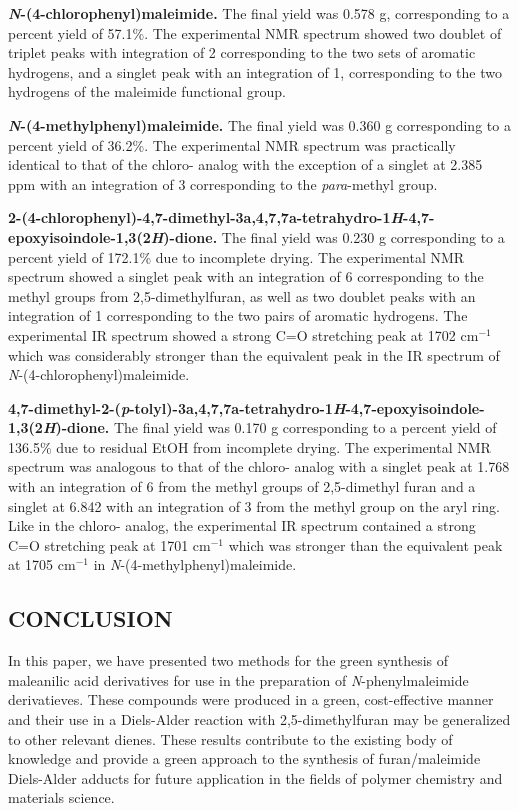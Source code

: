 \documentclass[11pt]{article}
\let\bf\textbf
\begin{document}
\bf{\textit{N}-(4-chlorophenyl)maleimide.} The final yield was 0.578 g, corresponding to a percent yield of 57.1\%. The experimental NMR spectrum showed two doublet of triplet peaks with integration of 2 corresponding to the two sets of aromatic hydrogens, and a singlet peak with an integration of 1, corresponding to the two hydrogens of the maleimide functional group. 

\bf{\textit{N}-(4-methylphenyl)maleimide.} The final yield was 0.360 g corresponding to a percent yield of 36.2\%. The experimental NMR spectrum was practically identical to that of the chloro- analog with the exception of a singlet at 2.385 ppm with an integration of 3 corresponding to the \textit{para}-methyl group.

\bf{2-(4-chlorophenyl)-4,7-dimethyl-3a,4,7,7a-tetrahydro-1\textit{H}-4,7-epoxyisoindole-1,3(2\textit{H})-dione.} The final yield was 0.230 g corresponding to a percent yield of 172.1\% due to incomplete drying. The experimental NMR spectrum showed a singlet peak with an integration of 6 corresponding to the methyl groups from 2,5-dimethylfuran, as well as two doublet peaks with an integration of 1 corresponding to the two pairs of aromatic hydrogens. The experimental IR spectrum showed a strong C=O stretching peak at 1702 cm$^{-1}$ which was considerably stronger than the equivalent peak in the IR spectrum of \textit{N}-(4-chlorophenyl)maleimide. 

\bf{4,7-dimethyl-2-(\textit{p}-tolyl)-3a,4,7,7a-tetrahydro-1\textit{H}-4,7-epoxyisoindole-1,3(2\textit{H})-dione.} The final yield was 0.170 g corresponding to a percent yield of 136.5\% due to residual EtOH from incomplete drying. The experimental NMR spectrum was analogous to that of the chloro- analog with a singlet peak at 1.768 with an integration of 6 from the methyl groups of 2,5-dimethyl furan and a singlet at 6.842 with an integration of 3 from the methyl group on the aryl ring. Like in the chloro- analog, the experimental IR spectrum contained a strong C=O stretching peak at 1701 cm$^{-1}$ which was stronger than the equivalent peak at 1705 cm$^{-1}$ in \textit{N}-(4-methylphenyl)maleimide.

\subsection*{CONCLUSION}
In this paper, we have presented two methods for the green synthesis of maleanilic acid derivatives for use in the preparation of \textit{N}-phenylmaleimide derivatieves. These compounds were produced in a green, cost-effective manner and their use in a Diels-Alder reaction with 2,5-dimethylfuran may be generalized to other relevant dienes. These results contribute to the existing body of knowledge and provide a green approach to the synthesis of furan/maleimide Diels-Alder adducts for future application in the fields of polymer chemistry and materials science.
\end{document}
